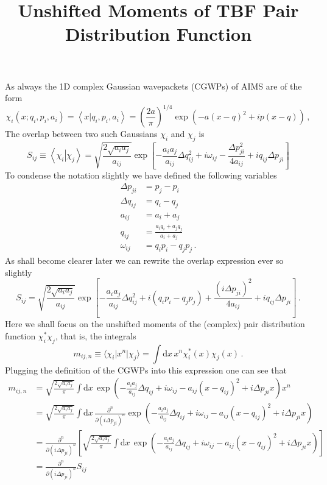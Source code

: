 \documentclass[a4paper, 11pt]{scrartcl}
\title{Unshifted Moments of TBF Pair Distribution Function}
\author{\vspace{-0.5cm}}
\date{\vspace{-0.5cm}}
\newcommand{\parenths}[1]{\left(#1\right)}
\newcommand{\sqbrackets}[1]{\left[#1\right]}
\newcommand{\braketl}[2]{\left\langle\left. #1 \right| #2 \right\rangle}
\newcommand{\bigbrakete}[3]{\big\langle #1 \big| #2 \big| #3 \big\rangle}
\newcommand{\ds}[1]{\mathrm{d}#1}
\begin{document}
\maketitle
As always the 1D complex Gaussian wavepackets (CGWPs) of AIMS are of the form 
\begin{equation}
    \chi_i(x; q_i, p_i, a_i) = \braketl{x}{q_i, p_i, a_i} = \parenths{\frac{2 a}{\pi}}^{1/4} \exp\parenths{- a (x-q)^2 + 
    i p (x-q)}\,, 
\end{equation}
The overlap between two such Gaussians $\chi_i$ and $\chi_j$ is 
\begin{equation} 
    S_{ij}  \equiv \braketl{\chi_i}{\chi_j} = 
    \sqrt{ \frac{2 \sqrt{a_i a_j}}{a_{ij}} } 
    \exp\sqbrackets{-\frac{a_i a_j}{a_{ij}} \Delta q_{ij}^2 + i \omega_{ij}  
    - \frac{ \Delta p_{ji}^2 }{4 a_{ij}} + i q_{ij} \Delta p_{ji} }
\end{equation}
To condense the notation slightly we have defined the following variables
\begin{align}
    \Delta p_{ji} &= p_j - p_i \\
    \Delta q_{ij} &= q_i - q_j \\
    a_{ij} &= a_i + a_j \\
    q_{ij} &= \frac{a_i q_i + a_j q_j}{a_i + a_j} \\
    \omega_{ij} &= q_i p_i - q_j p_j\,. 
\end{align}
As shall become clearer later we can rewrite the overlap expression ever so slightly
\begin{equation} 
    S_{ij} = 
    \sqrt{ \frac{2 \sqrt{a_i a_j}}{a_{ij}} } 
    \exp\sqbrackets{-\frac{a_i a_j}{a_{ij}} \Delta q_{ij}^2 + i (q_i p_i - q_j p_j) 
    + \frac{ (i\Delta p_{ji})^2 }{4 a_{ij}} + i q_{ij} \Delta p_{ji} }\,.
\end{equation}
Here we shall focus on the unshifted moments of the (complex) pair distribution function $\chi_i^* 
\chi_j$, that is, the integrals
\begin{equation}
    m_{ij, n} \equiv \bigbrakete{\chi_i}{x^n}{\chi_j} = \int\ds{x}\, x^n 
    \chi_i^*(x) \chi_j(x)\,.
\end{equation}
Plugging the definition of the CGWPs into this expression one can see that
\begin{align}
    \nonumber
    m_{ij, n} &= \sqrt{ \frac{2 \sqrt{a_i a_j}}{\pi} } \int\ds{x}\, 
    \exp\parenths{-\frac{a_i a_j}{a_{ij}} \Delta q_{ij} + i \omega_{ij} - 
    a_{ij} (x - q_{ij})^2 + i \Delta p_{ji} x} x^n \\
    \nonumber
    &= \sqrt{ \frac{2 \sqrt{a_i a_j}}{\pi} } \int\ds{x}\, \frac{\partial^n}{\partial (i\Delta p_{ji})^n} 
    \exp\parenths{-\frac{a_i a_j}{a_{ij}} \Delta q_{ij} + i \omega_{ij} - 
    a_{ij} (x - q_{ij})^2 + i \Delta p_{ji} x} \\
    \nonumber
    &= \frac{\partial^n}{\partial (i\Delta p_{ji})^n} \sqbrackets{ 
    \sqrt{ \frac{2 \sqrt{a_i a_j}}{\pi} } \int\ds{x}\,  
    \exp\parenths{-\frac{a_i a_j}{a_{ij}} \Delta q_{ij} + i \omega_{ij} - 
    a_{ij} (x - q_{ij})^2 + i \Delta p_{ji} x} }\\
    &= \frac{\partial^n}{\partial (i\Delta p_{ji})^n} S_{ij}
\end{align}
\end{document}
